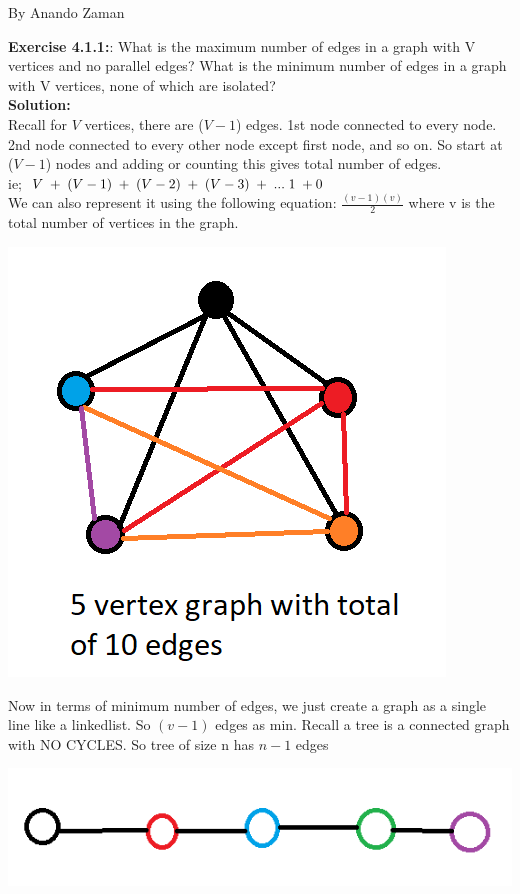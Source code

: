 \documentclass[11pt,fleqn]{article}
\begin{document}
By Anando Zaman

\textbf{Exercise 4.1.1:}: What is the maximum number of edges in a graph with V vertices and no parallel
edges? What is the minimum number of edges in a graph with V vertices, none of
which are isolated?\\

\textbf{Solution:}\\
Recall for $V$ vertices, there are ($V-1$) edges. 1st node connected to every node. 2nd node connected to every other node except first node, and so on. So start at ($V-1$) nodes and adding or counting this gives total number of edges.\\

ie; $V \thickspace + \thickspace (V-1) \thickspace + \thickspace (V-2) \thickspace + \thickspace (V-3) \thickspace + \thickspace ... \thickspace 1 \thickspace + 0$\\

We can also represent it using the following equation: $\frac{(v-1)(v)}{2}$ where v is the total number of vertices in the graph.

\begin{center}
	\includegraphics[scale=1]{4.1.1.png}
\end{center}

Now in terms of minimum number of edges, we just create a graph as a single line like a linkedlist. So $(v-1)$ edges as min. Recall a tree is a connected graph with NO CYCLES. So tree of size n has $n-1$ edges

\begin{center}
	\includegraphics[scale=1]{4.1.1-soln.png}
\end{center}
	
\end{document}
